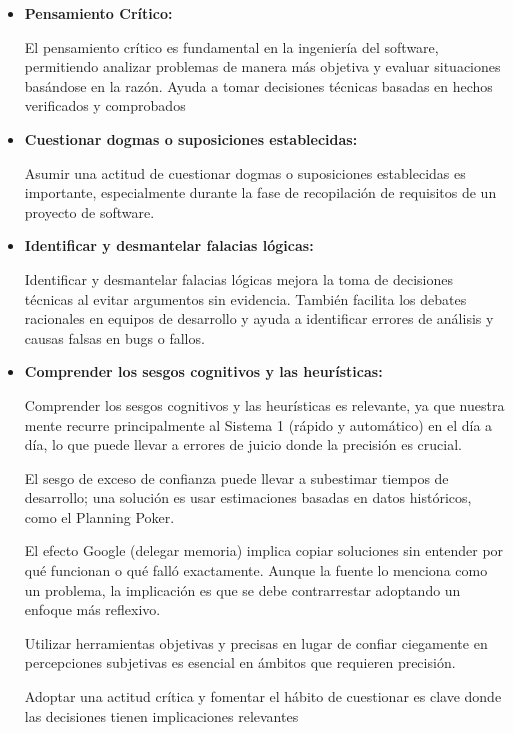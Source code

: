 \documentclass[a4paper,12pt,twoside]{article}
\begin{document}
\begin{itemize}
    \item \textbf{Pensamiento Crítico:} 
    
    El pensamiento crítico es fundamental en la ingeniería del software, permitiendo analizar problemas de manera 
    más objetiva y evaluar situaciones basándose en la razón. Ayuda a tomar decisiones técnicas basadas en hechos verificados y comprobados

    \item\textbf{Cuestionar dogmas o suposiciones establecidas:} 
    
    Asumir una actitud de cuestionar dogmas o suposiciones establecidas es importante, especialmente 
    durante la fase de recopilación de requisitos de un proyecto de software.

    \item\textbf{Identificar y desmantelar falacias lógicas:}
    
    Identificar y desmantelar falacias lógicas mejora la toma de decisiones técnicas al evitar 
    argumentos sin evidencia. También facilita los debates racionales en equipos de desarrollo y 
    ayuda a identificar errores de análisis y causas falsas en bugs o fallos.

    \item\textbf{Comprender los sesgos cognitivos y las heurísticas:} 
    
    Comprender los sesgos cognitivos y las heurísticas es relevante, ya que nuestra mente recurre
    principalmente al Sistema 1 (rápido y automático) en el día a día, lo que puede llevar a errores 
    de juicio donde la precisión es crucial.

    El sesgo de exceso de confianza puede llevar a subestimar tiempos de desarrollo; una solución 
    es usar estimaciones basadas en datos históricos, como el Planning Poker.

    El efecto Google (delegar memoria) implica copiar soluciones sin entender por qué funcionan o 
    qué falló exactamente. Aunque la fuente lo menciona como un problema, la implicación es que 
    se debe contrarrestar adoptando un enfoque más reflexivo.

    Utilizar herramientas objetivas y precisas en lugar de confiar ciegamente en percepciones 
    subjetivas es esencial en ámbitos que requieren precisión. 
    
    Adoptar una actitud crítica y fomentar el hábito de cuestionar es clave donde las decisiones 
    tienen implicaciones relevantes

\end{itemize}
\end{document}
